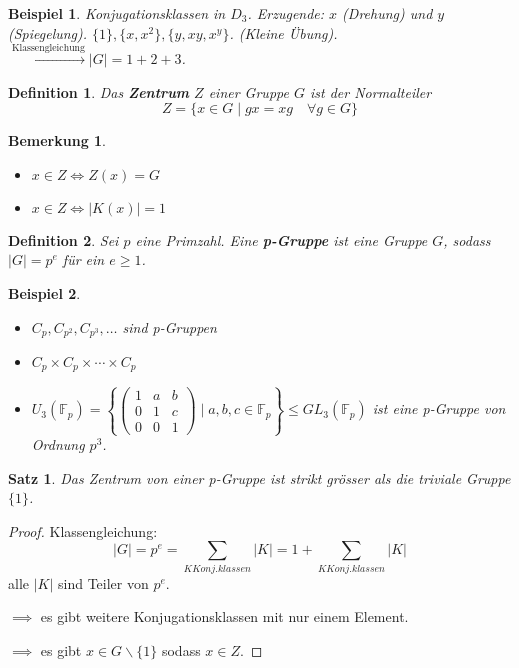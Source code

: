 \documentclass{article}
\theoremstyle{plain}
\newtheorem{definition}{Definition}
\newtheorem{theorem}{Satz}
\newtheorem{beispiel}{Beispiel}
\newtheorem{bemerkung}{Bemerkung}
\newcommand{\defn}[1]{\textbf{#1}}
\newcommand{\F}{\mathbb{F}}
\newcommand{\ug}{\leq}
\begin{document}
\begin{beispiel}
    Konjugationsklassen in $D_3$. Erzugende: $x$ (Drehung) und $y$ (Spiegelung).
    $\{1\}, \{x, x^2\}, \{y,xy,x^y\}$. (Kleine Übung).
    $\xrightarrow{\text{Klassengleichung}} |G| = 1+2+3$.
\end{beispiel}
\begin{definition}
    Das \defn{Zentrum} $Z$ einer Gruppe $G$ ist der Normalteiler 
    $$Z = \{x\in G\mid gx=xg\quad \forall g\in G\}$$
\end{definition}
\begin{bemerkung}
    \quad
    \begin{itemize}
        \item $x\in Z \Leftrightarrow Z(x) = G$
        \item $x\in Z\Leftrightarrow |K(x)|=1$
    \end{itemize}
\end{bemerkung}
\begin{definition}
    Sei $p$ eine Primzahl. Eine \defn{p-Gruppe} ist eine Gruppe $G$, sodass $|G|=p^e$ für ein $e\geq1$.
\end{definition}
\begin{beispiel}
    \quad
    \begin{itemize}
        \item $C_p, C_{p^2}, C_{p^3}, \ldots$ sind p-Gruppen
        \item $C_p \times C_p \times \cdots \times C_p$
        \item $U_3(\F_p)=\left\{\begin{pmatrix}
            1&a&b\\
            0&1&c\\
            0&0&1
        \end{pmatrix}\mid a,b,c\in \F_p\right\} \ug GL_3(\F_p)$ ist eine p-Gruppe von Ordnung $p^3$.
    \end{itemize}
\end{beispiel}
\begin{theorem}
    Das Zentrum von einer p-Gruppe ist strikt grösser als die triviale Gruppe $\{1\}$.
\end{theorem}
\begin{proof}
    Klassengleichung:
    $$|G|=p^e=\sum\limits_{K Konj.klassen}|K|=1+\sum\limits_{K Konj.klassen}|K|$$
    alle $|K|$ sind Teiler von $p^e$.
    
    $\implies$ es gibt weitere Konjugationsklassen mit nur einem Element.
    
    $\implies$ es gibt $x\in G\backslash \{1\}$ sodass $x\in Z$.
\end{proof}
\end{document}
